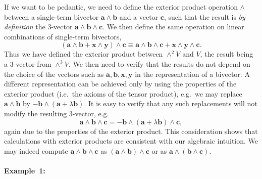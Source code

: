 If we want to be pedantic, we need to define the exterior product
operation $\wedge$ between a single-term bivector $\mathbf{a}\wedge\mathbf{b}$
and a vector $\mathbf{c}$, such that the result is \emph{by} \emph{definition}
the 3-vector $\mathbf{a}\wedge\mathbf{b}\wedge\mathbf{c}$. We then
define the same operation on linear combinations of single-term bivectors,
\[
\left(\mathbf{a}\wedge\mathbf{b}+\mathbf{x}\wedge\mathbf{y}\right)\wedge\mathbf{c}\equiv\mathbf{a}\wedge\mathbf{b}\wedge\mathbf{c}+\mathbf{x}\wedge\mathbf{y}\wedge\mathbf{c}.\]
Thus we have defined the exterior product between $\wedge^{2}V$ and
$V$, the result being a 3-vector from $\wedge^{3}V$. We then need
to verify that the results do not depend on the choice of the vectors
such as $\mathbf{a},\mathbf{b},\mathbf{x},\mathbf{y}$ in the representation
of a bivector: A different representation can be achieved only by
using the properties of the exterior product (i.e.~the axioms of
the tensor product), e.g.~we may replace $\mathbf{a}\wedge\mathbf{b}$
by $-\mathbf{b}\wedge\left(\mathbf{a}+\lambda\mathbf{b}\right)$.
It is easy to verify that any such replacements will not modify the
resulting 3-vector, e.g. \[
\mathbf{a}\wedge\mathbf{b}\wedge\mathbf{c}=-\mathbf{b}\wedge\left(\mathbf{a}+\lambda\mathbf{b}\right)\wedge\mathbf{c},\]
again due to the properties of the exterior product. This consideration
shows that calculations with exterior products are consistent with
our algebraic intuition. We may indeed compute $\mathbf{a}\wedge\mathbf{b}\wedge\mathbf{c}$
as $\left(\mathbf{a}\wedge\mathbf{b}\right)\wedge\mathbf{c}$ or as
$\mathbf{a}\wedge\left(\mathbf{b}\wedge\mathbf{c}\right)$.


\paragraph{Example~1:}

